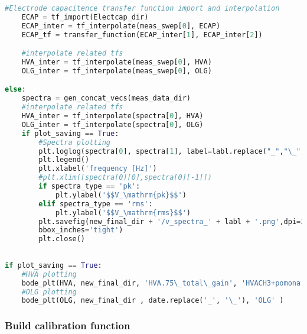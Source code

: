 \begin{lstlisting}[frame=single, language=Python]
    #Electrode capacitence transfer function import and interpolation
    ECAP = tf_import(Electcap_dir)                                           # Import and interpolate LPF measurement (part of frequency dependent drive to electrodes)
    ECAP_inter = tf_interpolate(meas_swep[0], ECAP)
    ECAP_tf = transfer_function(ECAP_inter[1], ECAP_inter[2])

    #interpolate related tfs
    HVA_inter = tf_interpolate(meas_swep[0], HVA)                            # HVA CH3 and OLG interpolation
    OLG_inter = tf_interpolate(meas_swep[0], OLG)

else:                                                                        # if the measurement is not a transfer function (spectra measurement)
    spectra = gen_concat_vecs(meas_data_dir)                                 # changed from concat_vecs to gen_concat_vecs (07-25-2021)
    #interpolate related tfs
    HVA_inter = tf_interpolate(spectra[0], HVA)                              # HVA CH3 and OLG interpolation
    OLG_inter = tf_interpolate(spectra[0], OLG)
    if plot_saving == True:
        #Spectra plotting
        plt.loglog(spectra[0], spectra[1], label=labl.replace("_","\_"))
        plt.legend()
        plt.xlabel('frequency [Hz]')
        #plt.xlim([spectra[0][0],spectra[0][-1]])
        if spectra_type == 'pk':
            plt.ylabel('$$V_\mathrm{pk}$$')
        elif spectra_type == 'rms':
            plt.ylabel('$$V_\mathrm{rms}$$')
        plt.savefig(new_final_dir + '/v_spectra_' + labl + '.png',dpi=300, \
        bbox_inches='tight')
        plt.close()
        
        
if plot_saving == True:                                                      # plot and HVACH3 and OLG if requested
    #HVA plotting
    bode_plt(HVA, new_final_dir, 'HVA.75\_total\_gain', 'HVACH3+pomona')
    #OLG plotting
    bode_plt(OLG, new_final_dir , date.replace('_', '\_'), 'OLG' )
\end{lstlisting}

\subsubsection{Build calibration
function}\label{build-calibration-function}

